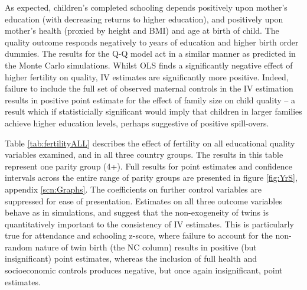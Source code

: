 \documentclass{article}[11pt,subeqn]
\begin{document}
\begin{spacing}{1.5}

As expected, children's completed schooling depends positively upon mother's education (with decreasing returns to higher education), 
and positively upon mother's health (proxied by height and BMI) and age at birth of child.  The quality outcome responds negatively to 
years of education and higher birth order dummies.  The results for the Q-Q model act in a similar manner as predicted in the Monte
Carlo simulations.  Whilst OLS finds a significantly negative effect of higher fertility on quality, IV estimates are significantly
more positive.  Indeed, failure to include the full set of observed maternal controls in the IV estimation results in positive point estimate
for the effect of family size on child quality -- a result which if statisticially significant would imply that children in larger families achieve  
higher education levels, perhaps suggestive of positive spill-overs. 


Table \ref{tab:fertilityALL} describes the effect of fertility on all educational quality variables examined, and in all three country groups.  The results in this table represent one parity group (4+).  Full results for point estimates and confidence intervals across the entire range of parity groups are presented in figure \ref{fig:YrS}, appendix \ref{scn:Graphs}. The coefficients on further control variables are suppressed for ease of presentation. Estimates on all three outcome variables behave as in simulations, and suggest that the non-exogeneity of twins is quantitatively important to the consistency of IV estimates.  This is particularly true for attendance and schooling z-score, where failure to account for the non-random nature of twin birth (the NC column) results in positive (but insignificant) point estimates, whereas the inclusion of full health and socioeconomic controls produces negative, but once again insignificant, point estimates.


\end{spacing}
\end{document}
